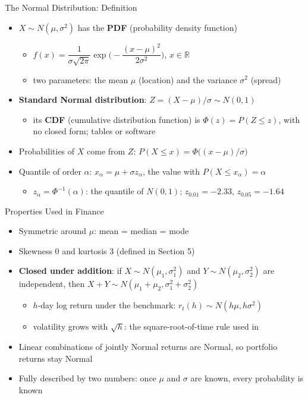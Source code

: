 \begin{frame}{The Normal Distribution: Definition}
\itemsize{\small}
\begin{itemize}
    \item $X \sim N(\mu, \sigma^2)$ has the \textbf{PDF} (probability density function)
    \begin{itemize}
        \item $f(x) = \dfrac{1}{\sigma\sqrt{2\pi}} \exp\Big(-\dfrac{(x - \mu)^2}{2\sigma^2}\Big)$, \quad $x \in \mathbb{R}$
        \item two parameters: the mean $\mu$ (location) and the variance $\sigma^2$ (spread)
    \end{itemize}
    \item \textbf{Standard Normal distribution}: $Z = (X - \mu)/\sigma \sim N(0, 1)$
    \begin{itemize}
        \item its \textbf{CDF} (cumulative distribution function) is $\Phi(z) = P(Z \le z)$, with no closed form; tables or software
    \end{itemize}
    \item Probabilities of $X$ come from $Z$: $P(X \le x) = \Phi\big((x - \mu)/\sigma\big)$
    \item Quantile of order $\alpha$: $x_\alpha = \mu + \sigma z_\alpha$, the value with $P(X \le x_\alpha) = \alpha$
    \begin{itemize}
        \item $z_\alpha = \Phi^{-1}(\alpha)$: the quantile of $N(0, 1)$; $z_{0.01} = -2.33$, $z_{0.05} = -1.64$
    \end{itemize}
\end{itemize}
\end{frame}

\begin{frame}{Properties Used in Finance}
\itemsize{\small}
\begin{itemize}
    \item Symmetric around $\mu$: mean = median = mode
    \item Skewness $0$ and kurtosis $3$ (defined in Section 5)
    \item \textbf{Closed under addition}: if $X \sim N(\mu_1, \sigma_1^2)$ and $Y \sim N(\mu_2, \sigma_2^2)$ are independent, then $X + Y \sim N(\mu_1 + \mu_2, \sigma_1^2 + \sigma_2^2)$
    \begin{itemize}
        \item $h$-day log return under the benchmark: $r_t(h) \sim N(h\mu, h\sigma^2)$
        \item volatility grows with $\sqrt{h}$: the square-root-of-time rule used in 
    \end{itemize}
    \item Linear combinations of jointly Normal returns are Normal, so portfolio returns stay Normal
    \item Fully described by two numbers: once $\mu$ and $\sigma$ are known, every probability is known
\end{itemize}
\end{frame}

